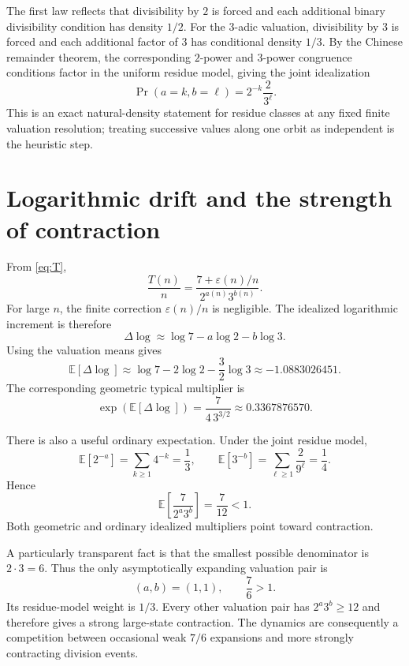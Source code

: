 \documentclass[11pt]{article}
\begin{document}
The first law reflects that divisibility by $2$ is forced and each additional binary divisibility condition has density $1/2$. For the $3$-adic valuation, divisibility by $3$ is forced and each additional factor of $3$ has conditional density $1/3$. By the Chinese remainder theorem, the corresponding $2$-power and $3$-power congruence conditions factor in the uniform residue model, giving the joint idealization
\begin{equation}
\Pr(a=k,b=\ell)=2^{-k}\frac{2}{3^\ell}.
\label{eq:joint}
\end{equation}
This is an exact natural-density statement for residue classes at any fixed finite valuation resolution; treating successive values along one orbit as independent is the heuristic step.

\section{Logarithmic drift and the strength of contraction}
From \eqref{eq:T},
\begin{equation}
\frac{T(n)}{n}=\frac{7+\varepsilon(n)/n}{2^{a(n)}3^{b(n)}}.
\label{eq:ratio}
\end{equation}
For large $n$, the finite correction $\varepsilon(n)/n$ is negligible. The idealized logarithmic increment is therefore
\[
\Delta\log\approx\log7-a\log2-b\log3.
\]
Using the valuation means gives
\begin{equation}
\mathbb E[\Delta\log]\approx
\log7-2\log2-\frac32\log3
\approx-1.0883026451.
\label{eq:drift}
\end{equation}
The corresponding geometric typical multiplier is
\[
\exp(\mathbb E[\Delta\log])
=\frac{7}{4\,3^{3/2}}
\approx0.3367876570.
\]

There is also a useful ordinary expectation. Under the joint residue model,
\[
\mathbb E[2^{-a}]=\sum_{k\ge1}4^{-k}=\frac13,
\qquad
\mathbb E[3^{-b}]=\sum_{\ell\ge1}\frac{2}{9^\ell}=\frac14.
\]
Hence
\begin{equation}
\mathbb E\!\left[\frac{7}{2^a3^b}\right]=\frac{7}{12}<1.
\label{eq:ordinary}
\end{equation}
Both geometric and ordinary idealized multipliers point toward contraction.

A particularly transparent fact is that the smallest possible denominator is $2\cdot3=6$. Thus the only asymptotically expanding valuation pair is
\[
(a,b)=(1,1),\qquad \frac{7}{6}>1.
\]
Its residue-model weight is $1/3$. Every other valuation pair has $2^a3^b\ge12$ and therefore gives a strong large-state contraction. The dynamics are consequently a competition between occasional weak $7/6$ expansions and more strongly contracting division events.
\end{document}
